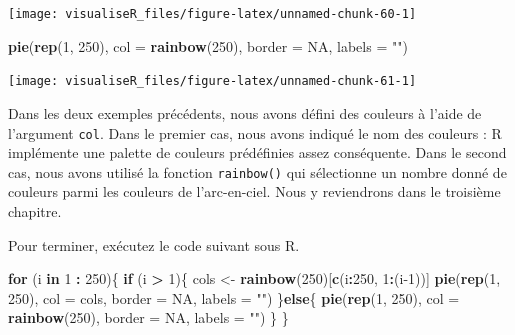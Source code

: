 \documentclass[]{article}
\newenvironment{Shaded}{\begin{snugshade}}{\end{snugshade}}
\newcommand{\ControlFlowTok}[1]{\textcolor[rgb]{0.13,0.29,0.53}{\textbf{#1}}}
\newcommand{\DataTypeTok}[1]{\textcolor[rgb]{0.13,0.29,0.53}{#1}}
\newcommand{\DecValTok}[1]{\textcolor[rgb]{0.00,0.00,0.81}{#1}}
\newcommand{\KeywordTok}[1]{\textcolor[rgb]{0.13,0.29,0.53}{\textbf{#1}}}
\newcommand{\NormalTok}[1]{#1}
\newcommand{\OperatorTok}[1]{\textcolor[rgb]{0.81,0.36,0.00}{\textbf{#1}}}
\newcommand{\OtherTok}[1]{\textcolor[rgb]{0.56,0.35,0.01}{#1}}
\newcommand{\StringTok}[1]{\textcolor[rgb]{0.31,0.60,0.02}{#1}}
\begin{document}
\begin{center}\texttt{[image: visualiseR\_files/figure-latex/unnamed-chunk-60-1]} \end{center}

\begin{Shaded}
\begin{Highlighting}[]
\KeywordTok{pie}\NormalTok{(}\KeywordTok{rep}\NormalTok{(}\DecValTok{1}\NormalTok{, }\DecValTok{250}\NormalTok{), }\DataTypeTok{col =} \KeywordTok{rainbow}\NormalTok{(}\DecValTok{250}\NormalTok{), }\DataTypeTok{border =} \OtherTok{NA}\NormalTok{, }\DataTypeTok{labels =} \StringTok{""}\NormalTok{)}
\end{Highlighting}
\end{Shaded}

\begin{center}\texttt{[image: visualiseR\_files/figure-latex/unnamed-chunk-61-1]} \end{center}

Dans les deux exemples précédents, nous avons défini des couleurs à l'aide de l'argument \texttt{col}. Dans le premier cas, nous avons indiqué le nom des couleurs : R implémente une palette de couleurs prédéfinies assez conséquente. Dans le second cas, nous avons utilisé la fonction \texttt{rainbow()} qui sélectionne un nombre donné de couleurs parmi les couleurs de l'arc-en-ciel. Nous y reviendrons dans le troisième chapitre.

Pour terminer, exécutez le code suivant sous R.

\begin{Shaded}
\begin{Highlighting}[]
\ControlFlowTok{for}\NormalTok{ (i }\ControlFlowTok{in} \DecValTok{1} \OperatorTok{:}\StringTok{ }\DecValTok{250}\NormalTok{)\{}
  \ControlFlowTok{if}\NormalTok{ (i }\OperatorTok{>}\StringTok{ }\DecValTok{1}\NormalTok{)\{}
\NormalTok{    cols <-}\StringTok{ }\KeywordTok{rainbow}\NormalTok{(}\DecValTok{250}\NormalTok{)[}\KeywordTok{c}\NormalTok{(i}\OperatorTok{:}\DecValTok{250}\NormalTok{, }\DecValTok{1}\OperatorTok{:}\NormalTok{(i}\DecValTok{-1}\NormalTok{))]}
    \KeywordTok{pie}\NormalTok{(}\KeywordTok{rep}\NormalTok{(}\DecValTok{1}\NormalTok{, }\DecValTok{250}\NormalTok{), }\DataTypeTok{col =}\NormalTok{ cols, }\DataTypeTok{border =} \OtherTok{NA}\NormalTok{, }\DataTypeTok{labels =} \StringTok{""}\NormalTok{)}
\NormalTok{  \}}\ControlFlowTok{else}\NormalTok{\{}
    \KeywordTok{pie}\NormalTok{(}\KeywordTok{rep}\NormalTok{(}\DecValTok{1}\NormalTok{, }\DecValTok{250}\NormalTok{), }\DataTypeTok{col =} \KeywordTok{rainbow}\NormalTok{(}\DecValTok{250}\NormalTok{), }\DataTypeTok{border =} \OtherTok{NA}\NormalTok{, }\DataTypeTok{labels =} \StringTok{""}\NormalTok{)}
\NormalTok{  \}}
\NormalTok{\}}
\end{Highlighting}
\end{Shaded}
\end{document}
